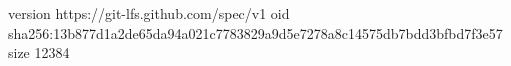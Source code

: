 version https://git-lfs.github.com/spec/v1
oid sha256:13b877d1a2de65da94a021c7783829a9d5e7278a8c14575db7bdd3bfbd7f3e57
size 12384
